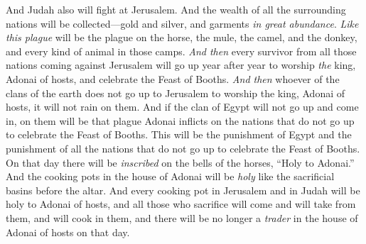 \begin{biblechapter}
\verse And Judah also will fight at Jerusalem. And the wealth of all the surrounding nations will be collected—gold and silver, and garments \textit{in great abundance}.
\verse \textit{Like this plague} will be the plague on the horse, the mule, the camel, and the donkey, and every kind of animal in those camps.
\verse \textit{And then} every survivor from all those nations coming against Jerusalem will go up year after year to worship \textit{the} king, Adonai of hosts, and celebrate the Feast of Booths.
\verse \textit{And then} whoever of the clans of the earth does not go up to Jerusalem to worship the king, Adonai of hosts, it will not rain on them.
\verse And if the clan of Egypt will not go up and come in, on them will be that plague Adonai inflicts on the nations that do not go up to celebrate the Feast of Booths.
\verse This will be the punishment of Egypt and the punishment of all the nations that do not go up to celebrate the Feast of Booths.
\verse On that day there will be \textit{inscribed} on the bells of the horses, “Holy to Adonai.” And the cooking pots in the house of Adonai will be \textit{holy} like the sacrificial basins before the altar.
\verse And every cooking pot in Jerusalem and in Judah will be holy to Adonai of hosts, and all those who sacrifice will come and will take from them, and will cook in them, and there will be no longer a \textit{trader} in the house of Adonai of hosts on that day.
\end{biblechapter}

